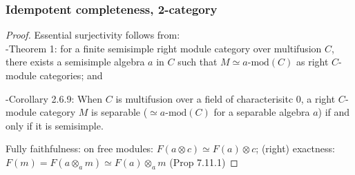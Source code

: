 \documentclass{beamer}
\newcommand{\tnsr}{\otimes}
\newcommand{\amod}[1]{{#1\textrm{-mod}}}
\begin{document}
\begin{frame}
\frametitle{Idempotent completeness, 2-category}

\begin{proof}
Essential surjectivity follows from:\\
-\cite{Ostrik}{Theorem 1}: for a finite semisimple right module
category over multifusion $C$, there exists a semisimple algebra
$a$ in $C$ such that $M \simeq \amod{a}(C)$
as right $C$-module categories; and

\pause
-\cite{DSPSb}{Corollary 2.6.9}: When $C$ is multifusion over
a field of characterisitc 0,
a right $C$-module category $M$ is separable
($\simeq \amod{a}(C)$ for a separable algebra $a$)
if and only if it is semisimple.

\pause

Fully faithfulness:
\pause
on free modules: $F(a \tnsr c) \simeq F(a) \tnsr c$;
\pause
(right) exactness: $F(m) = F(a \tnsr_a m) \simeq F(a) \tnsr_a m$
\pause
(\cite{EGNO}{Prop 7.11.1})
\end{proof}


\end{frame}
\end{document}

